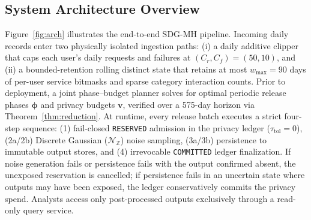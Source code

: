 \documentclass[sigconf, nonacm]{acmart}
\begin{document}
\subsection{System Architecture Overview}
Figure~\ref{fig:arch} illustrates the end-to-end SDG-MH pipeline. Incoming daily records enter two physically isolated ingestion paths: (i) a daily additive clipper that caps each user's daily requests and failures at $(C_r, C_f) = (50, 10)$, and (ii) a bounded-retention rolling distinct state that retains at most $w_{\max}=90$ days of per-user service bitmasks and sparse category interaction counts. Prior to deployment, a joint phase--budget planner solves for optimal periodic release phases $\boldsymbol{\phi}$ and privacy budgets $\mathbf{v}$, verified over a 575-day horizon via Theorem~\ref{thm:reduction}. At runtime, every release batch executes a strict four-step sequence: (1) fail-closed \texttt{RESERVED} admission in the privacy ledger ($\tau_{\mathrm{tol}}=0$), (2a/2b) Discrete Gaussian ($\mathcal{N}_{\mathbb{Z}}$) noise sampling, (3a/3b) persistence to immutable output stores, and (4) irrevocable \texttt{COMMITTED} ledger finalization. If noise generation fails or persistence fails with the output confirmed absent, the unexposed reservation is cancelled; if persistence fails in an uncertain state where outputs may have been exposed, the ledger conservatively commits the privacy spend. Analysts access only post-processed outputs exclusively through a read-only query service.
\end{document}
